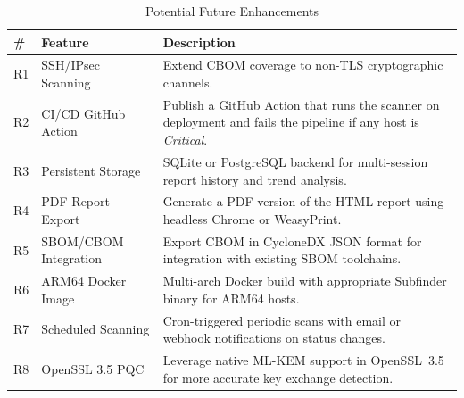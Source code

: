\begin{table}[H]
  \centering
  \caption{Potential Future Enhancements}
  \label{tab:roadmap}
  \begin{tabularx}{\textwidth}{C{0.5cm} L{4.5cm} L{9cm}}
    \toprule
    \textbf{\#} & \textbf{Feature} & \textbf{Description} \\
    \midrule
    R1 & SSH/IPsec Scanning     & Extend CBOM coverage to non-TLS cryptographic
                                  channels. \\
    R2 & CI/CD GitHub Action    & Publish a GitHub Action that runs the scanner
                                  on deployment and fails the pipeline if any host
                                  is \textit{Critical}. \\
    R3 & Persistent Storage     & SQLite or PostgreSQL backend for multi-session
                                  report history and trend analysis. \\
    R4 & PDF Report Export      & Generate a PDF version of the HTML report using
                                  headless Chrome or WeasyPrint. \\
    R5 & SBOM/CBOM Integration  & Export CBOM in CycloneDX JSON format for
                                  integration with existing SBOM toolchains. \\
    R6 & ARM64 Docker Image     & Multi-arch Docker build with appropriate
                                  Subfinder binary for ARM64 hosts. \\
    R7 & Scheduled Scanning     & Cron-triggered periodic scans with email or
                                  webhook notifications on status changes. \\
    R8 & OpenSSL 3.5 PQC        & Leverage native ML-KEM support in OpenSSL~3.5
                                  for more accurate key exchange detection. \\
    \bottomrule
  \end{tabularx}
\end{table}
